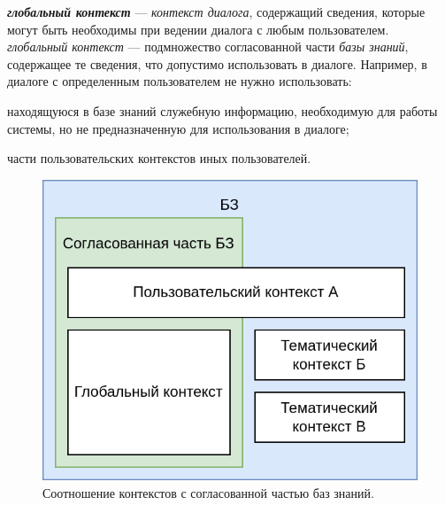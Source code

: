 \textbf{\textit{глобальный контекст}} --- \textit{контекст диалога}, содержащий сведения, которые могут быть необходимы при ведении диалога с любым пользователем.
    \textit{глобальный контекст} --- подмножество согласованной части \textit{базы знаний}, содержащее те сведения, что допустимо использовать в диалоге.
Например, в диалоге с определенным пользователем не нужно использовать:
\begin{textitemize}
    \item находящуюся в базе знаний служебную информацию, необходимую для работы системы, но не предназначенную для использования в диалоге;
    \item части пользовательских контекстов иных пользователей.
\end{textitemize}

\begin{figure}[h]
    \centering
    \includegraphics[scale=0.3]{images/part4/chapter_nl_interfaces/context_in_KB}
    \caption{Соотношение контекстов с согласованной частью баз знаний.}
    \label{fig:context_in_KB}
\end{figure}

\begin{SCn}

    \begin{scnindent}
        \begin{scneqtoset}
        \end{scneqtoset}
    \end{scnindent}

\end{SCn}

